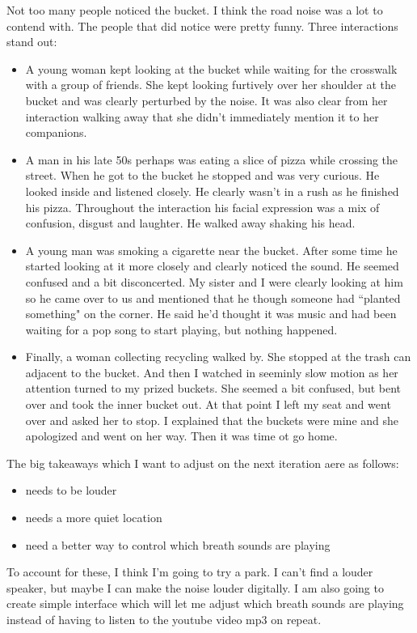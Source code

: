 \documentclass[11pt]{report}
\begin{document}
\begin{itmemize}
Not too many people noticed the bucket. I think the road noise was a lot to contend with. The people that did notice were pretty funny. Three interactions stand out:
\begin{itemize}
\item
A young woman kept looking at the bucket while waiting for the crosswalk with a group of friends. She kept looking furtively over her shoulder at the bucket and was clearly perturbed by the noise. It was also clear from her interaction walking away that she didn't immediately mention it to her companions. 
\item
A man in his late 50s perhaps was eating a slice of pizza while crossing the street. When he got to the bucket he stopped and was very curious. He looked inside and listened closely. He clearly wasn't in a rush as he finished his pizza. Throughout the interaction his facial expression was a mix of confusion, disgust and laughter. He walked away shaking his head. 
\item
A young man was smoking a cigarette near the bucket. After some time he started looking at it more closely and clearly noticed the sound. He seemed confused and a bit disconcerted. My sister and I were clearly looking at him so he came over to us and mentioned that he though someone had ``planted something" on the corner. He said he'd thought it was music and had been waiting for a pop song to start playing, but nothing happened. 
\item
Finally, a woman collecting recycling walked by. She stopped at the trash can adjacent to the bucket. And then I watched in seeminly slow motion as her attention turned to my prized buckets. She seemed a bit confused, but bent over and took the inner bucket out. At that point I left my seat and went over and asked her to stop. I explained that the buckets were mine and she apologized and went on her way. Then it was time ot go home.
\end{itemize}

The big takeaways which I want to adjust on the next iteration aere as follows:
\begin{itemize}
\item
needs to be louder
\item
needs a more quiet location
\item
need a better way to control which breath sounds are playing
\end{itemize}

To account for these, I think I'm going to try a park. I can't find a louder speaker, but maybe I can make the noise louder digitally. I am also going to create simple interface which will let me adjust which breath sounds are playing instead of having to listen to the youtube video mp3 on repeat.
\newpage

\end{itmemize}
\end{document}
